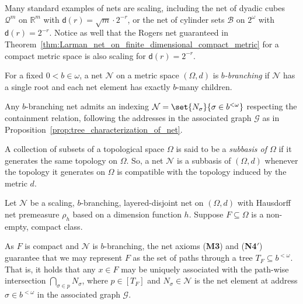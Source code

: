 Many standard examples of nets are scaling, including the net of dyadic cubes $\mathcal{Q}^m$ on $\mathbb{R}^m$ with $\mathsf{d}(r) = \sqrt{m} \cdot 2^{-r}$, or the net of cylinder sets $\mathcal{B}$ on $2^\omega$ with $\mathsf{d}(r) = 2^{-r}$. Notice as well that the Rogers net guaranteed in Theorem~\ref{thm:Larman_net_on_finite_dimensional_compact_metric} for a compact metric space is also scaling for $\mathsf{d}(r) = 2^{-r}$. 

\begin{definition}
    For a fixed $0 < b \in \omega$, a net $\mathcal{N}$ on a metric space $(\Omega, d)$ is \textit{$b$-branching} if $\mathcal{N}$ has a single root and each net element has exactly $b$-many children. 
\end{definition}

Any $b$-branching net admits an indexing $\mathcal{N} = \set{N_\sigma}{\sigma \in b^{<\omega}}$ respecting the containment relation, following the addresses in the associated graph $\mathcal{G}$ as in Proposition~\ref{prop:tree_characterization_of_net}. 

A collection of subsets of a topological space $\Omega$ is said to be a \textit{subbasis of $\Omega$} if it generates the same topology on $\Omega$. So, a net $\mathcal{N}$ is a subbasis of $(\Omega, d)$ whenever the topology it generates on $\Omega$ is compatible with the topology induced by the metric $d$. 

Let $\mathcal{N}$ be a scaling, $b$-branching, layered-disjoint net on $(\Omega, d)$ with Hausdorff net premeasure $\rho_h$ based on a dimension function $h$. Suppose $F \subseteq \Omega$ is a non-empty, compact class.

As $F$ is compact and $\mathcal{N}$ is $b$-branching, the net axioms (\textbf{M3}) and (\textbf{N4}$'$) guarantee that we may represent $F$ as the set of paths through a tree $T_F \subseteq b^{<\omega}$. That is, it holds that any $x \in F$ may be uniquely associated with the path-wise intersection $\bigcap_{\sigma \in p} N_\sigma$, where $p \in [T_F]$ and $N_\sigma \in \mathcal{N}$ is the net element at address $\sigma \in b^{<\omega}$ in the associated graph $\mathcal{G}$.

